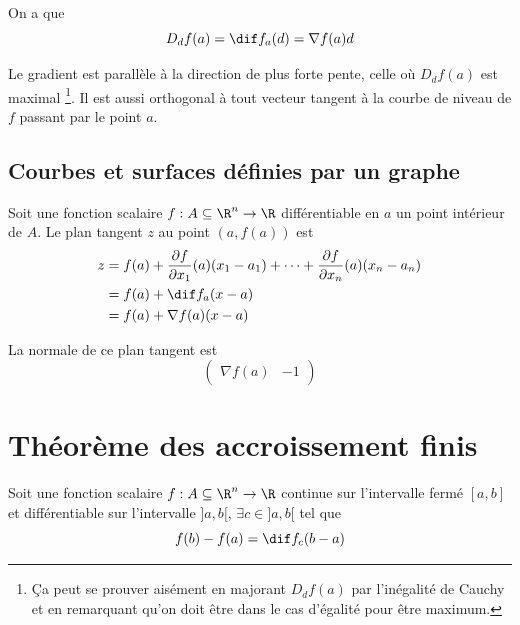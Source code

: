 \begin{myform} On a que
	\[ D_df(a) = \dif f_a(d) = \nabla f(a) d \]
\end{myform}

\begin{myprop} Le gradient est parallèle à la direction de plus forte pente,
	celle où $D_df(a)$ est maximal
	\footnote{\c{C}a peut se prouver aisément en majorant $D_df(a)$ par l'inégalité de Cauchy et en remarquant qu'on doit être dans le cas d'égalité pour être maximum.}.
	Il est aussi orthogonal à tout vecteur tangent à la courbe de niveau de $f$ passant par le point $a$.
\end{myprop}

\subsection{Courbes et surfaces définies par un graphe}

\begin{myform}
	Soit une fonction scalaire $f : A \subseteq \R^n \to \R$ différentiable en $a$ un point intérieur de $A$. Le plan tangent $z$ au point $(a,f(a))$ est
	\begin{align*}
		z & = f(a) + \frac{\pa f}{\pa x_1}(a)(x_1 - a_1) + \cdots + \frac{\pa f}{\pa x_n}(a) (x_n - a_n) \\
		& = f(a) + \dif f_a(x-a) \\
		& = f(a) + \nabla f(a)(x-a)
	\end{align*}

	La normale de ce plan tangent est
	\[
	\begin{pmatrix}
		\nabla f(a) & -1
	\end{pmatrix}
	\]
\end{myform}


\section{Théorème des accroissement finis}

\begin{mytheo} Soit une fonction scalaire $f : A \subseteq \R^n \to \R$ continue sur l'intervalle fermé $[a,b]$ et différentiable sur l'intervalle $]a,b[$, $\exists c \in ]a,b[$ tel que
	\[ f(b) - f(a) = \dif f_c(b-a) \]
\end{mytheo}

